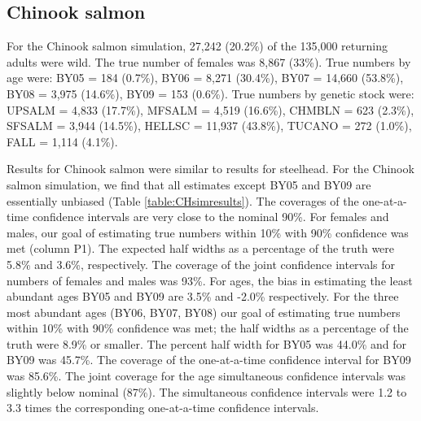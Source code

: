 \documentclass[12pt]{article}
\begin{document}
\subsection{Chinook salmon}

For the Chinook salmon simulation, 27,242 (20.2\%) of the 135,000 returning adults were wild. The true number of females was 8,867 (33\%). True numbers by age were: BY05 = 184 (0.7\%), BY06 = 8,271 (30.4\%), BY07 = 14,660 (53.8\%), BY08 = 3,975 (14.6\%), BY09 = 153 (0.6\%). True numbers by genetic stock were: UPSALM = 4,833 (17.7\%), MFSALM = 4,519 (16.6\%), CHMBLN = 623 (2.3\%), SFSALM = 3,944 (14.5\%), HELLSC = 11,937 (43.8\%), TUCANO = 272 (1.0\%), FALL = 1,114 (4.1\%).

Results for Chinook salmon were similar to results for steelhead. For the Chinook salmon simulation, we find that all estimates except BY05 and BY09 are essentially unbiased (Table \ref{table:CHsimresults}). The coverages of the one-at-a-time confidence intervals are very close to the nominal 90\%. For females and males, our goal of estimating true numbers within 10\% with 90\% confidence was met (column P1). The expected half widths as a percentage of the truth were 5.8\% and 3.6\%, respectively. The coverage of the joint confidence intervals for numbers of females and males was 93\%. For ages, the bias in estimating the least abundant ages BY05 and BY09 are 3.5\% and -2.0\% respectively. For the three most abundant ages (BY06, BY07, BY08) our goal of estimating true numbers within 10\% with 90\% confidence was met; the half widths as a percentage of the truth were 8.9\% or smaller. The percent half width for BY05 was 44.0\% and for BY09 was 45.7\%. The coverage of the one-at-a-time confidence interval for BY09 was 85.6\%. The joint coverage for the age simultaneous confidence intervals was slightly below nominal (87\%). The simultaneous confidence intervals were 1.2 to 3.3 times the corresponding one-at-a-time confidence intervals.
\end{document}
